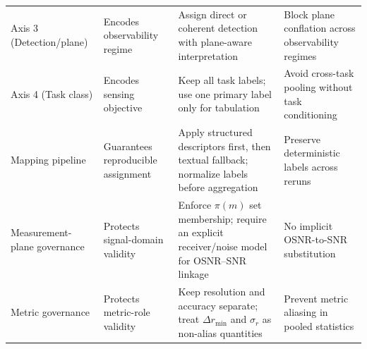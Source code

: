 \begin{table}[!t]
\begin{tabularx}{\textwidth}{@{}>{\raggedright\arraybackslash}p{2.15cm} >{\raggedright\arraybackslash}X >{\raggedright\arraybackslash}X >{\raggedright\arraybackslash}X@{}}
        Axis 3 (Detection/plane)                                                                                  &
        Encodes observability regime                                                                              &
        Assign direct or coherent detection with plane-aware interpretation                                       &
        Block plane conflation across observability regimes                                                         \\

        Axis 4 (Task class)                                                                                       &
        Encodes sensing objective                                                                                 &
        Keep all task labels; use one primary label only for tabulation                                           &
        Avoid cross-task pooling without task conditioning                                                          \\

        Mapping pipeline                                                                                          &
        Guarantees reproducible assignment                                                                        &
        Apply structured descriptors first, then textual fallback; normalize labels before aggregation            &
        Preserve deterministic labels across reruns                                                                 \\

        Measurement-plane governance                                                                              &
        Protects signal-domain validity                                                                           &
        Enforce $\pi(m)$ set membership; require an explicit receiver/noise model for OSNR--SNR linkage           &
        No implicit OSNR-to-SNR substitution                                                                        \\

        Metric governance                                                                                         &
        Protects metric-role validity                                                                             &
        Keep resolution and accuracy separate; treat $\Delta r_{\min}$ and $\sigma_r$ as non-alias quantities     &
        Prevent metric aliasing in pooled statistics                                                                \\


\end{tabularx}
\end{table}
